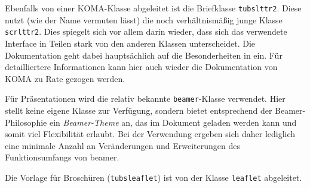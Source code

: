 Ebenfalls von einer KOMA-Klasse abgeleitet ist die Briefklasse
\texttt{tubslttr2}.
Diese nutzt (wie der Name vermuten lässt) die noch verhältnismäßig junge
Klasse \texttt{scrlttr2}. Dies spiegelt sich vor allem darin wieder, dass sich
das verwendete Interface in Teilen stark von den anderen Klassen unterscheidet.
Die Dokumentation geht dabei hauptsächlich auf die Besonderheiten in
\tubslatex ein.
Für detailliertere Informationen kann hier auch wieder die Dokumentation von
KOMA\cite{koma-skript} zu Rate gezogen werden.

Für Präsentationen wird die relativ bekannte \texttt{beamer}-Klasse verwendet.
Hier stellt \tubslatex keine eigene Klasse zur Verfügung,
sondern bietet entsprechend der Beamer-Philosophie ein \emph{Beamer-Theme} an,
das im Dokument geladen werden kann und somit viel Flexibilität erlaubt.
Bei der Verwendung ergeben sich daher lediglich eine minimale Anzahl an
Veränderungen und Erweiterungen des Funktionsumfangs von beamer.

Die Vorlage für Broschüren (\texttt{tubsleaflet}) ist
von der Klasse \texttt{leaflet} abgeleitet.


